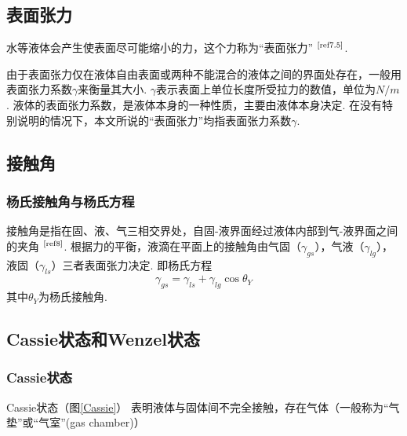 \documentclass[a4paper,12pt]{article}%
\begin{document}
\subsection{表面张力}
\begin{spacing}{1.528}%
水等液体会产生使表面尽可能缩小的力，这个力称为“表面张力”
$^\text{\cite{ref7.5}}$. 

由于表面张力仅在液体自由表面或两种不能混合的液体之间的界面处存在，一般用表面张力系数$\gamma$来衡量其大小. $\gamma$表示表面上单位长度所受拉力的数值，单位为$N/m$. 液体的表面张力系数，是液体本身的一种性质，主要由液体本身决定. 
在没有特别说明的情况下，本文所说的“表面张力”均指表面张力系数$\gamma$. 
\end{spacing}

\subsection{接触角}
\subsubsection{杨氏接触角与杨氏方程}
\begin{spacing}{1.528}%
接触角是指在固、液、气三相交界处，自固-液界面经过液体内部到气-液界面之间的夹角
$^\text{\cite{ref8}}$. 
根据力的平衡，液滴在平面上的接触角由气固（$\gamma_{gs}$），气液（$\gamma_{lg}$），液固（$\gamma_{ls}$）三者表面张力决定. 
即杨氏方程
\begin{equation}
    \gamma_{gs}=\gamma_{ls}+\gamma_{lg}\cos\theta_{Y}
\end{equation}
其中$\theta_Y$为杨氏接触角. 
\end{spacing}

\subsection{Cassie状态和Wenzel状态}
\subsubsection{Cassie状态}
Cassie状态（图\ref{Cassie}）%
表明液体与固体间不完全接触，存在气体（一般称为“气垫”或“气室”(gas chamber)）
\end{document}
